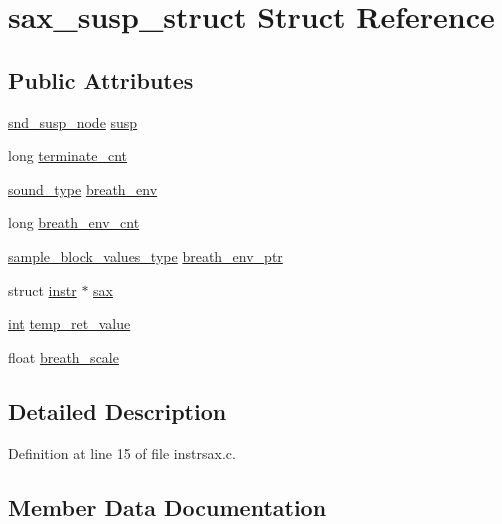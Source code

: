 \hypertarget{structsax__susp__struct}{}\section{sax\+\_\+susp\+\_\+struct Struct Reference}
\label{structsax__susp__struct}
\subsection*{Public Attributes}
\begin{DoxyCompactItemize}
\item 
\hyperlink{sound_8h_a6b268203688a934bd798ceb55f85d4c0}{snd\+\_\+susp\+\_\+node} \hyperlink{structsax__susp__struct_a26726c75098c4ccc67fabfb95b11cc03}{susp}
\item 
long \hyperlink{structsax__susp__struct_ab88ea967f932437505713c35b8668b56}{terminate\+\_\+cnt}
\item 
\hyperlink{sound_8h_a792cec4ed9d6d636d342d9365ba265ea}{sound\+\_\+type} \hyperlink{structsax__susp__struct_a25cb1bf8bed4c0239f37266de6de33d2}{breath\+\_\+env}
\item 
long \hyperlink{structsax__susp__struct_adc09a4c8d9033f24e8c3b3312b657cb3}{breath\+\_\+env\+\_\+cnt}
\item 
\hyperlink{sound_8h_a83d17f7b465d1591f27cd28fc5eb8a03}{sample\+\_\+block\+\_\+values\+\_\+type} \hyperlink{structsax__susp__struct_a64656bbf5a2ad87ef353766edc354f4d}{breath\+\_\+env\+\_\+ptr}
\item 
struct \hyperlink{structinstr}{instr} $\ast$ \hyperlink{structsax__susp__struct_a13a2e6a117f3e9c5647c4fdafee8c350}{sax}
\item 
\hyperlink{xmltok_8h_a5a0d4a5641ce434f1d23533f2b2e6653}{int} \hyperlink{structsax__susp__struct_a1f4df3f09c7c1f715375f92d95743523}{temp\+\_\+ret\+\_\+value}
\item 
float \hyperlink{structsax__susp__struct_aeaf89a78a654e03afc6e5f659c3a72ce}{breath\+\_\+scale}
\end{DoxyCompactItemize}


\subsection{Detailed Description}


Definition at line 15 of file instrsax.\+c.



\subsection{Member Data Documentation}
